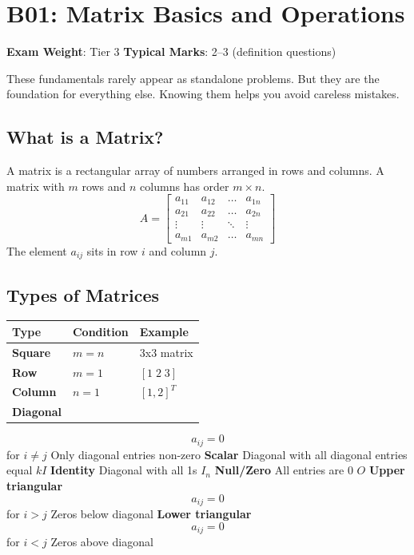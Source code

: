 \documentclass[
]{article}
\renewenvironment{quote}
  {\begin{tcolorbox}[
     colback=calloutbg,
     colframe=calloutframe,
     colupper=callouttext,
     arc=3pt,
     boxrule=0.5pt,
     leftrule=0.5pt,
     borderline west={3pt}{0pt}{calloutaccent},
     left=8pt,
     right=8pt,
     top=6pt,
     bottom=6pt
   ]}
  {\end{tcolorbox}}
\begin{document}
\section{B01: Matrix Basics and
Operations}\label{b01-matrix-basics-and-operations}

\begin{quote}
\textbf{Exam Weight}: Tier 3 \textbar{} \textbf{Typical Marks}: 2--3
(definition questions)
\end{quote}

These fundamentals rarely appear as standalone problems. But they are
the foundation for everything else. Knowing them helps you avoid
careless mistakes.

\subsection{What is a Matrix?}\label{what-is-a-matrix}

A matrix is a rectangular array of numbers arranged in rows and columns.
A matrix with \(m\) rows and \(n\) columns has order \(m \times n\).
\[
A =
\begin{bmatrix}
a_{11} & a_{12} & \dots & a_{1n} \\
a_{21} & a_{22} & \dots & a_{2n} \\
\vdots & \vdots & \ddots & \vdots \\
a_{m1} & a_{m2} & \dots & a_{mn}
\end{bmatrix}
\]
The element \(a_{ij}\) sits in row \(i\) and column \(j\).

\subsection{Types of Matrices}\label{types-of-matrices}

\begin{longtable}[]{@{}lll@{}}
\toprule\noalign{}
Type & Condition & Example \\
\midrule\noalign{}
\endhead
\bottomrule\noalign{}
\endlastfoot
\textbf{Square} & \(m = n\) & 3x3 matrix \\
\textbf{Row} & \(m = 1\) & \([1 \; 2 \; 3]\) \\
\textbf{Column} & \(n = 1\) & \([1, 2]^T\) \\
\textbf{Diagonal} & & \\
\end{longtable}
\[
a_{ij} = 0
\]
for \(i \neq j\) \textbar{} Only diagonal entries non-zero \textbar{}
\textbar{} \textbf{Scalar} \textbar{} Diagonal with all diagonal entries
equal \textbar{} \(kI\) \textbar{} \textbar{} \textbf{Identity}
\textbar{} Diagonal with all 1s \textbar{} \(I_n\) \textbar{} \textbar{}
\textbf{Null/Zero} \textbar{} All entries are 0 \textbar{} \(O\)
\textbar{} \textbar{} \textbf{Upper triangular} \textbar{}
\[
a_{ij} = 0
\]
for \(i > j\) \textbar{} Zeros below diagonal \textbar{} \textbar{}
\textbf{Lower triangular} \textbar{}
\[
a_{ij} = 0
\]
for \(i < j\) \textbar{} Zeros above diagonal \textbar{}
\end{document}
